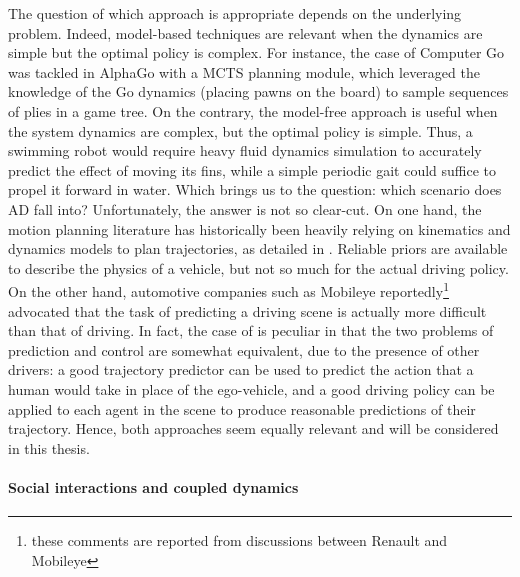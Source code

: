 The question of which approach is appropriate depends on the underlying problem. Indeed, \gls{model-based} techniques are relevant when the dynamics are simple but the optimal policy is complex. For instance, the case of Computer Go was tackled in AlphaGo \citep{Silver2016,Silver2017,Silver2018} with a \gls{MCTS} planning module, which leveraged the knowledge of the Go dynamics (placing pawns on the board) to sample sequences of plies in a game tree. On the contrary, the \gls{model-free} approach is useful when the system dynamics are complex, but the optimal policy is simple. Thus, a swimming robot would require heavy fluid dynamics simulation to accurately predict the effect of moving its fins, while a simple periodic gait could suffice to propel it forward in water. Which brings us to the question: which scenario does \gls{AD} fall into? Unfortunately, the answer is not so clear-cut. On one hand, the motion planning literature has historically been heavily relying on kinematics and dynamics models to plan trajectories, as detailed in . Reliable priors are available to describe the physics of a vehicle, but not so much for the actual driving policy. On the other hand, automotive companies such as Mobileye reportedly\footnote{these comments are reported from discussions between Renault and Mobileye} advocated that the task of predicting a driving scene is actually more difficult than that of driving. In fact, the case of  is peculiar in that the two problems of prediction and control are somewhat equivalent, due to the presence of other drivers: a good trajectory predictor can be used to predict the action that a human would take in place of the ego-vehicle, and a good driving policy can be applied to each agent in the scene to produce reasonable predictions of their trajectory. Hence, both approaches seem equally relevant and will be considered in this thesis.

\paragraph{Social interactions and coupled dynamics}


